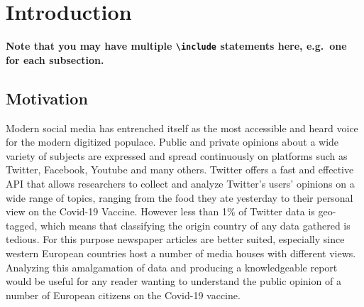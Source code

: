 \chapter{Introduction}

\textbf{Note that you may have multiple \texttt{{\textbackslash}include} statements here, e.g.\ one for each subsection.}

\section{Motivation} %

Modern social media has entrenched itself as the most accessible and heard voice for the modern digitized populace.
Public and private opinions about a wide variety of subjects are expressed and spread continuously on platforms such as Twitter, Facebook, Youtube and many others.
Twitter offers a fast and effective \acs{API} that allows researchers to collect and analyze Twitter's users' opinions on a wide range of topics, ranging from the food they ate yesterday to their personal view on the Covid-19 Vaccine.
However less than 1\% of Twitter data is geo-tagged, which means that classifying the origin country of any data gathered is tedious.
For this purpose newspaper articles are better suited, especially since western European countries host a number of media houses with different views.
Analyzing this amalgamation of data and producing a knowledgeable report would be useful for any reader wanting to understand the public opinion of a number of European citizens on the Covid-19 vaccine.





